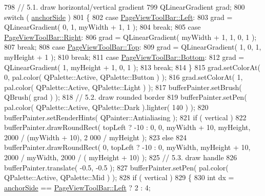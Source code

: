 \begin{DoxyCode}
798     \textcolor{comment}{// 5.1. draw horizontal/vertical gradient}
799     QLinearGradient grad;
800     \textcolor{keywordflow}{switch} ( \hyperlink{classToolBarPrivate_ab776848ec81463b3008086418bc55161}{anchorSide} )
801     \{
802         \textcolor{keywordflow}{case} \hyperlink{classPageViewToolBar_a6410ac0bc9e35fba1314cfd6d7049385ae2896772e25f563086c120f64857fa6c}{PageViewToolBar::Left}:
803             grad = QLinearGradient( 0, 1, myWidth + 1, 1 );
804             \textcolor{keywordflow}{break};
805         \textcolor{keywordflow}{case} \hyperlink{classPageViewToolBar_a6410ac0bc9e35fba1314cfd6d7049385a67d6065aeb6f242a23f9b9ae2426b136}{PageViewToolBar::Right}:
806             grad = QLinearGradient( myWidth + 1, 1, 0, 1 );
807             \textcolor{keywordflow}{break};
808         \textcolor{keywordflow}{case} \hyperlink{classPageViewToolBar_a6410ac0bc9e35fba1314cfd6d7049385aa0a8431d0106205e2fd3d2122ec3a2e3}{PageViewToolBar::Top}:
809             grad = QLinearGradient( 1, 0, 1, myHeight + 1 );
810             \textcolor{keywordflow}{break};
811         \textcolor{keywordflow}{case} \hyperlink{classPageViewToolBar_a6410ac0bc9e35fba1314cfd6d7049385ab20155b7a2791a54d63c84d188b67a43}{PageViewToolBar::Bottom}:
812             grad = QLinearGradient( 1, myHeight + 1, 0, 1 );
813             \textcolor{keywordflow}{break};
814     \}
815     grad.setColorAt( 0, pal.color( QPalette::Active, QPalette::Button ) );
816     grad.setColorAt( 1, pal.color( QPalette::Active, QPalette::Light ) );
817     bufferPainter.setBrush( QBrush( grad ) );
818     \textcolor{comment}{// 5.2. draw rounded border}
819     bufferPainter.setPen( pal.color( QPalette::Active, QPalette::Dark ).lighter( 140 ) );
820     bufferPainter.setRenderHints( QPainter::Antialiasing );
821     \textcolor{keywordflow}{if} ( vertical )
822         bufferPainter.drawRoundRect( topLeft ? -10 : 0, 0, myWidth + 10, myHeight, 2000 / (myWidth + 10), 2
      000 / myHeight );
823     \textcolor{keywordflow}{else}
824         bufferPainter.drawRoundRect( 0, topLeft ? -10 : 0, myWidth, myHeight + 10, 2000 / myWidth, 2000 / (
      myHeight + 10) );
825     \textcolor{comment}{// 5.3. draw handle}
826     bufferPainter.translate( -0.5, -0.5 );
827     bufferPainter.setPen( pal.color( QPalette::Active, QPalette::Mid ) );
828     \textcolor{keywordflow}{if} ( vertical )
829     \{
830         \textcolor{keywordtype}{int} dx = \hyperlink{classToolBarPrivate_ab776848ec81463b3008086418bc55161}{anchorSide} == \hyperlink{classPageViewToolBar_a6410ac0bc9e35fba1314cfd6d7049385ae2896772e25f563086c120f64857fa6c}{PageViewToolBar::Left} ? 2 : 4;

\end{DoxyCode}
